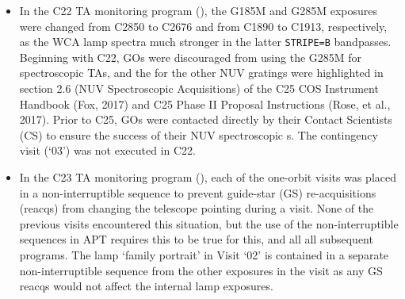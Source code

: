 \begin{itemize}
{The optional parameter \texttt{WAVECAL=YES} in the BOA$\times$MIRA target+Lamp image of the C20 program was discovered to not have taken the
expected internal lamp image in the \textsf{LC6601RYQ\_rawtag.fits} exposure. Correcting this inconsistency would have required significant APT, TRANS, and commanding changes.
As this internal calibration exposure combination is rarely executed, the C21 program included separate \texttt{TARGET=WAVE} companion lamp exposures for the target BOA exposure\footnote{The COS apertures are physically configured such that WCA light lands on the detector(s) when the PSA in place, but does not when the BOA is in place (INSERT REF). Therefore, whenever lamp images are required to verify BOA  exposures, the BOA is temporarily replaced by the PSA so that WCA light falls on the detector at the same location as it would fall for a PSA image.}
A second MIRA lamp image was added directly after the BOA$\times$MIRA , to verify the repeatability of the WCA lamp location when moving the BOA into and out of position.
To create time for the new exposures, the exposure times of the spectroscopic observations were scaled back, but still achieved the required S/N to measure the XD spectral locations.
}
\item{
In the C22 TA monitoring program (), the G185M and G285M exposures were changed from C2850 to C2676 and from C1890 to C1913, respectively, as the WCA lamp spectra much stronger in the latter \texttt{STRIPE=B} bandpasses. Beginning with C22, GOs were discouraged from using the G285M for spectroscopic  TAs,
and the \cenwaves{} for the other NUV gratings were highlighted in section 2.6 (NUV Spectroscopic Acquisitions) of the C25 COS Instrument Handbook (Fox, 2017) and C25 Phase II Proposal Instructions (Rose, et al., 2017). Prior to C25, GOs were contacted directly by their Contact Scientists (CS) to ensure the success of their NUV spectroscopic s.
The contingency visit (`03') was not executed in C22.
}
\item{
In the C23 TA monitoring program (), each of the one-orbit visits was placed in a non-interruptible sequence to prevent guide-star (GS) re-acquisitions (reacqs) from changing the telescope pointing during a visit.
None of the previous visits encountered this situation, but the use of the non-interruptible sequences in APT requires this to be true for this, and all all subsequent programs.
The lamp `family portrait' in Visit `02' is contained in a separate non-interruptible sequence from the other exposures in the visit as any GS reacqs would not affect the internal lamp exposures.
}
\end{itemize}
